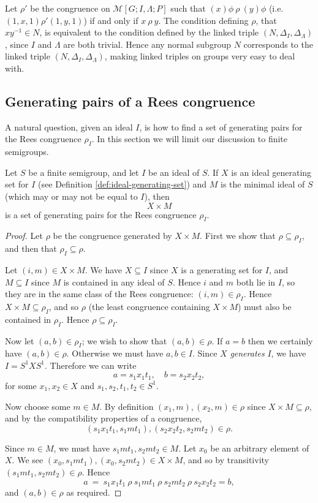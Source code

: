 Let $\rho'$ be the congruence on $\mathcal{M}[G; I, \Lambda; P]$ such that
$(x)\phi ~\rho~ (y)\phi$ (i.e.~$(1,x,1) \mathrel{\rho'} (1,y,1)$) if and only if
$x ~\rho~ y$.  The condition defining $\rho$, that $xy^{-1} \in N$, is
equivalent to the condition defined by the linked triple
$(N, \Delta_I, \Delta_\Lambda)$, since $I$ and $\Lambda$ are both trivial.
Hence any normal subgroup $N$ corresponds to the linked triple
$(N, \Delta_I, \Delta_\Lambda)$, making linked triples on groups very easy to
deal with.

\subsection{Generating pairs of a Rees congruence}
\label{sec:rees-to-pairs}
A natural question, given an ideal $I$, is how to find a set of generating pairs
for the Rees congruence $\rho_I$.  In this section we will limit our discussion
to finite semigroups.

\begin{theorem}
  Let $S$ be a finite semigroup, and let $I$ be an ideal of $S$.  If $X$ is an ideal
  generating set for $I$ (see Definition \ref{def:ideal-generating-set}) and $M$
  is the minimal ideal of $S$ (which may or may not be equal to $I$), then
  $$X \times M$$ is a set of generating pairs for the Rees congruence $\rho_I$.
  \begin{proof}
    Let $\rho$ be the congruence generated by $X \times M$.  First we show that
    $\rho \subseteq \rho_I$, and then that $\rho_I \subseteq \rho$.

    Let $(i,m) \in X \times M$.  We have $X \subseteq I$ since $X$ is a
    generating set for $I$, and $M \subseteq I$ since $M$ is contained in any
    ideal of $S$.  Hence $i$ and $m$ both lie in $I$, so they are in the same
    class of the Rees congruence: $(i,m) \in \rho_I$.  Hence $X \times M
    \subseteq \rho_I$, and so $\rho$ (the least congruence containing $X \times
    M$) must also be contained in $\rho_I$.  Hence $\rho \subseteq \rho_I$.

    Now let $(a,b) \in \rho_I$; we wish to show that $(a,b) \in \rho$.  If $a=b$
    then we certainly have $(a,b) \in \rho$.  Otherwise we must have $a,b \in
    I$.  Since $X$ \textit{generates} $I$, we have $I = S^1XS^1$.  Therefore we
    can write
    $$a = s_1x_1t_1, \quad b = s_2x_2t_2,$$
    for some $x_1,x_2 \in X$ and $s_1,s_2,t_1,t_2 \in S^1$.

    Now choose some $m \in M$.  By definition $(x_1,m), (x_2,m) \in \rho$ since
    $X \times M \subseteq \rho$, and
    by the compatibility properties of a congruence,
    $$(s_1x_1t_1,s_1mt_1), (s_2x_2t_2,s_2mt_2) \in \rho.$$

    Since $m \in M$, we must have $s_1mt_1,s_2mt_2 \in M$.  Let $x_0$ be an
    arbitrary element of $X$.
    We see $(x_0,s_1mt_1), (x_0,s_2mt_2) \in X \times M$, and so by transitivity
    $(s_1mt_1, s_2mt_2) \in \rho$.
    Hence
    $$a ~=~ s_1x_1t_1 ~\rho~ s_1mt_1 ~\rho~ s_2mt_2 ~\rho~ s_2x_2t_2 = b,$$
    and $(a,b) \in \rho$ as required.
  \end{proof}
\end{theorem}

